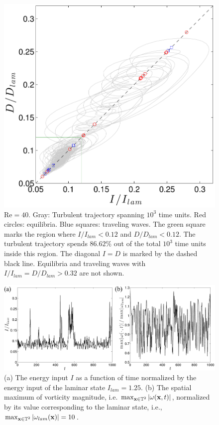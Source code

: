 \documentclass{jfm}
\begin{document}
\begin{figure}
\centering
\includegraphics[width=.75\textwidth]{ID_R40}		
\caption{$\mbox{Re}=40$. Gray: Turbulent trajectory spanning $10^3$ time units.
Red circles: equilibria.
Blue squares: traveling waves.
The green square marks the region where $I/I_{lam}<0.12$ and $D/D_{lam}<0.12$.
The turbulent trajectory spends $86.62\%$ out of the total $10^3$ time units inside this region.
The diagonal $I=D$ is marked by the dashed black line.
Equilibria and traveling waves with $I/I_{lam}=D/D_{lam}>0.32$ are not shown.
}
\label{fig:ID_R40}
\end{figure}
%
\begin{figure}
\centering
\includegraphics[width=\textwidth]{It}
\caption{(a) The energy input $I$ as a function of time normalized by the energy
input of the laminar state $I_{lam}=1.25$.
(b) The spatial maximum of
vorticity magnitude, i.e. $\max_{\mathbf x\in\mathbb T^2}|\omega(\mathbf x,t)|$, normalized by its value
corresponding to the laminar state, i.e.,
$\max_{\mathbf x\in\mathbb T^2}|\omega_{lam}(\mathbf x)|=10$.
}
\label{fig:It}
\end{figure}
\end{document}
